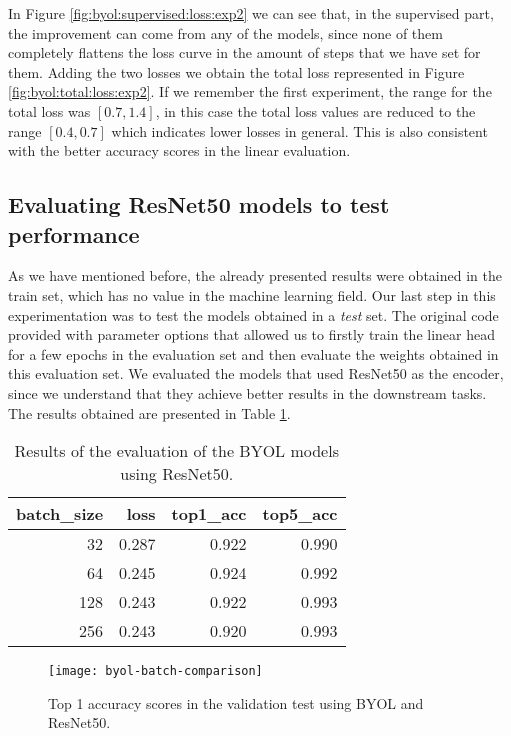 In Figure \ref{fig:byol:supervised:loss:exp2} we can see that, in the supervised part, the improvement can come from any of the models, since none of them completely flattens the loss curve in the amount of steps that we have set for them. Adding the two losses we obtain the total loss represented in Figure \ref{fig:byol:total:loss:exp2}. If we remember the first experiment, the range for the total loss was $[0.7,1.4]$, in this case the total loss values are reduced to the range $[0.4,0.7]$ which indicates lower losses in general. This is also consistent with the better accuracy scores in the linear evaluation.


\subsection{Evaluating ResNet50 models to test performance}
\label{byol:evaluation}

As we have mentioned before, the already presented results were obtained in the train set, which has no value in the machine learning field. Our last step in this experimentation was to test the models obtained in a \emph{test} set. The original code provided with parameter options that allowed us to firstly train the linear head for a few epochs in the evaluation set and then evaluate the weights obtained in this evaluation set. We evaluated the models that used ResNet50 as the encoder, since we understand that they achieve better results in the downstream tasks. The results obtained are presented in Table \ref{byol:final:results}. 

\begin{table}[H]
    \centering
    \begin{tabular}{rrrr}
    batch\_size & loss  & top1\_acc & top5\_acc \\ \hline
    32          & 0.287 & 0.922     & 0.990     \\
    64          & 0.245 & 0.924     & 0.992     \\
    128         & 0.243 & 0.922     & 0.993     \\
    256         & 0.243 & 0.920     & 0.993    
    \end{tabular}
    \caption{Results of the evaluation of the BYOL models using ResNet50.}
    \label{byol:final:results}
    \end{table}

    \begin{figure}[H]
        \centering
        \texttt{[image: byol-batch-comparison]}%
        \caption{Top 1 accuracy scores in the validation test using BYOL and ResNet50. }
        \label{fig:byol:batch:comparison}%
        \end{figure}


